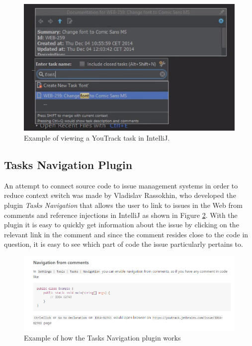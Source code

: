 \documentclass{4thYearProject}
\begin{document}
\begin{figure}[H]
\includegraphics[scale=0.5]{IntelliJ_Tasks}
\centering
\caption{Example of viewing a YouTrack task in IntelliJ.}
\label{fig:intellijtask}
\end{figure}

\subsection{Tasks Navigation Plugin}

An attempt to connect source code to issue management systems in order to reduce context switch was made by Vladislav Rassokhin, who developed the plugin \textit{Tasks Navigation} \cite{tasksnavigation} that allows the user to link to issues in the Web from comments and reference injections in IntelliJ as shown in Figure \ref{fig:tasksnavigation}. With the plugin it is easy to quickly get information about the issue by clicking on the relevant link in the comment and since the comment resides close to the code in question, it is easy to see which part of code the issue particularly pertains to. 

\begin{figure}[H]
\includegraphics[scale=0.6]{Tasks_Navigation_Plugin}
\centering
\caption{Example of how the Tasks Navigation plugin works}
\label{fig:tasksnavigation}
\end{figure}
\end{document}
